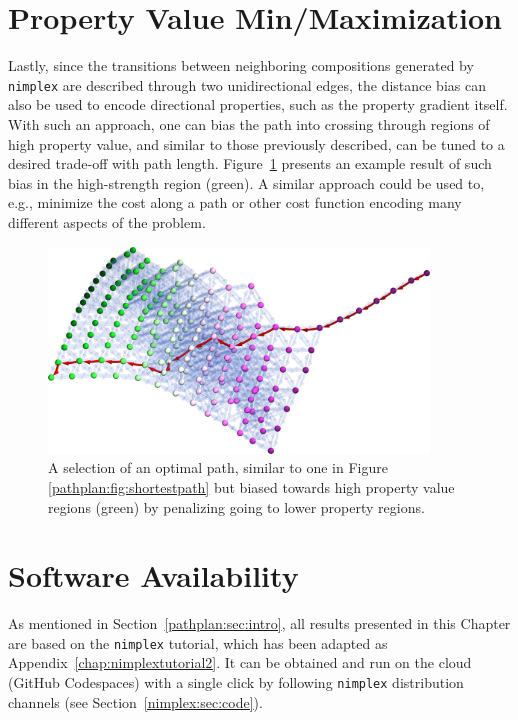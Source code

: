 \section{Property Value Min/Maximization} \label{pathplan:sec:minmax}

Lastly, since the transitions between neighboring compositions generated by \texttt{nimplex} are described through two unidirectional edges, the distance bias can also be used to encode directional properties, such as the property gradient itself. With such an approach, one can bias the path into crossing through regions of high property value, and similar to those previously described, can be tuned to a desired trade-off with path length. Figure~\ref{pathplan:fig:highrmsad} presents an example result of such bias in the high-strength region (green). A similar approach could be used to, e.g., minimize the cost along a path or other cost function encoding many different aspects of the problem.

\begin{figure}[H]
    \centering
    \includegraphics[width=0.9\textwidth]{pathplanning/InfeasibilityGliding_HighRMSAD.jpeg}
    \caption{A selection of an optimal path, similar to one in Figure \ref{pathplan:fig:shortestpath} but biased towards high property value regions (green) by penalizing going to lower property regions.}
    \label{pathplan:fig:highrmsad}
\end{figure}

\section{Software Availability} \label{pathplan:sec:softwareavaialbility}

As mentioned in Section~\ref{pathplan:sec:intro}, all results presented in this Chapter are based on the \texttt{nimplex} tutorial, which has been adapted as Appendix~\ref{chap:nimplextutorial2}. It can be obtained and run on the cloud (GitHub Codespaces) with a single click by following \texttt{nimplex} distribution channels (see Section~\ref{nimplex:sec:code}).




